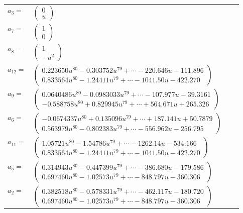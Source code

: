 \documentclass[1p]{elsarticle_modified}
\theoremstyle{definition}
\begin{document}
\begin{tabular}{m{7pt} m{180pt} m{7pt} m{180pt} }
\flushright $a_{3}=$&$\begin{pmatrix}0\\u\end{pmatrix}$ \\
\flushright $a_{7}=$&$\begin{pmatrix}1\\0\end{pmatrix}$ \\
\flushright $a_{8}=$&$\begin{pmatrix}1\\- u^2\end{pmatrix}$ \\
\flushright $a_{12}=$&$\begin{pmatrix}0.223650 u^{80}-0.303752 u^{79}+\cdots-220.646 u-111.896\\0.833564 u^{80}-1.24411 u^{79}+\cdots-1041.50 u-422.270\end{pmatrix}$ \\
\flushright $a_{9}=$&$\begin{pmatrix}0.0640486 u^{80}-0.0983033 u^{79}+\cdots-107.977 u-39.3161\\-0.588758 u^{80}+0.829945 u^{79}+\cdots+564.671 u+265.326\end{pmatrix}$ \\
\flushright $a_{6}=$&$\begin{pmatrix}-0.0674337 u^{80}+0.135096 u^{79}+\cdots+187.141 u+50.7879\\0.563979 u^{80}-0.802383 u^{79}+\cdots-556.962 u-256.795\end{pmatrix}$ \\
\flushright $a_{11}=$&$\begin{pmatrix}1.05721 u^{80}-1.54786 u^{79}+\cdots-1262.14 u-534.166\\0.833564 u^{80}-1.24411 u^{79}+\cdots-1041.50 u-422.270\end{pmatrix}$ \\
\flushright $a_{5}=$&$\begin{pmatrix}0.314943 u^{80}-0.447399 u^{79}+\cdots-386.680 u-179.586\\0.697460 u^{80}-1.02573 u^{79}+\cdots-848.797 u-360.306\end{pmatrix}$ \\
\flushright $a_{2}=$&$\begin{pmatrix}0.382518 u^{80}-0.578331 u^{79}+\cdots-462.117 u-180.720\\0.697460 u^{80}-1.02573 u^{79}+\cdots-848.797 u-360.306\end{pmatrix}$ \\

\end{tabular}
\end{document}
